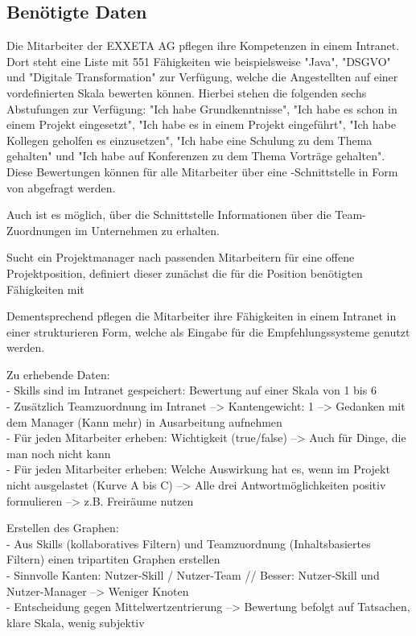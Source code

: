 \subsection{Benötigte Daten}
\label{ch:methodik:versuchsaufbau:daten}
Die Mitarbeiter der EXXETA AG pflegen ihre Kompetenzen in einem Intranet. Dort steht eine Liste mit 551 Fähigkeiten wie beispielsweise "Java", "DSGVO" und "Digitale Transformation" zur Verfügung, welche die Angestellten auf einer vordefinierten Skala bewerten können. Hierbei stehen die folgenden sechs Abstufungen zur Verfügung: "Ich habe Grundkenntnisse", "Ich habe es schon in einem Projekt eingesetzt", "Ich habe es in einem Projekt eingeführt", "Ich habe Kollegen geholfen es einzusetzen", "Ich habe eine Schulung zu dem Thema gehalten" und "Ich habe auf Konferenzen zu dem Thema Vorträge gehalten". Diese Bewertungen können für alle Mitarbeiter über eine -Schnittstelle in Form von  abgefragt werden.

Auch ist es möglich, über die Schnittstelle Informationen über die Team-Zuordnungen im Unternehmen zu erhalten.



\newpage
Sucht ein Projektmanager nach passenden Mitarbeitern für eine offene Projektposition, definiert dieser zunächst die für die Position benötigten Fähigkeiten mit

Dementsprechend pflegen die Mitarbeiter ihre Fähigkeiten in einem Intranet in einer strukturieren Form, welche als Eingabe für die Empfehlungssysteme genutzt werden.

Zu erhebende Daten:\\
- Skills sind im Intranet gespeichert: Bewertung auf einer Skala von 1 bis 6\\
- Zusätzlich Teamzuordnung im Intranet --> Kantengewicht: 1 --> Gedanken mit dem Manager (Kann mehr) in Ausarbeitung aufnehmen\\
- Für jeden Mitarbeiter erheben: Wichtigkeit (true/false) --> Auch für Dinge, die man noch nicht kann\\
- Für jeden Mitarbeiter erheben: Welche Auswirkung hat es, wenn im Projekt nicht ausgelastet (Kurve A bis C) --> Alle drei Antwortmöglichkeiten positiv formulieren --> z.B. Freiräume nutzen

Erstellen des Graphen:\\
- Aus Skills (kollaboratives Filtern) und Teamzuordnung (Inhaltsbasiertes Filtern) einen tripartiten Graphen erstellen\\
- Sinnvolle Kanten: Nutzer-Skill / Nutzer-Team // Besser: Nutzer-Skill und Nutzer-Manager --> Weniger Knoten\\
- Entscheidung gegen Mittelwertzentrierung --> Bewertung befolgt auf Tatsachen, klare Skala, wenig subjektiv

